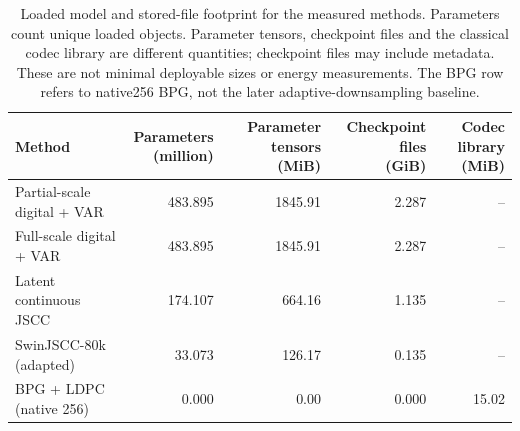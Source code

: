 \begin{table}[t]
\centering
\caption{Loaded model and stored-file footprint for the measured methods.
Parameters count unique loaded objects. Parameter tensors, checkpoint files and
the classical codec library are different quantities; checkpoint files may
include metadata. These are not minimal deployable sizes or energy measurements.
The BPG row refers to native256 BPG, not the later adaptive-downsampling baseline.}
\label{tab:single-output-storage}
\small
\setlength{\tabcolsep}{4pt}
\begin{tabular*}{\textwidth}{@{\extracolsep{\fill}}lrrrr@{}}
\toprule
Method & \shortstack{Parameters\\(million)} & \shortstack{Parameter tensors\\(MiB)} & \shortstack{Checkpoint files\\(GiB)} & \shortstack{Codec library\\(MiB)} \\
\midrule
Partial-scale digital + VAR & 483.895 & 1845.91 & 2.287 & -- \\
Full-scale digital + VAR & 483.895 & 1845.91 & 2.287 & -- \\
Latent continuous JSCC & 174.107 & 664.16 & 1.135 & -- \\
SwinJSCC-80k (adapted) & 33.073 & 126.17 & 0.135 & -- \\
BPG + LDPC (native 256) & 0.000 & 0.00 & 0.000 & 15.02 \\
\bottomrule
\end{tabular*}
\end{table}
